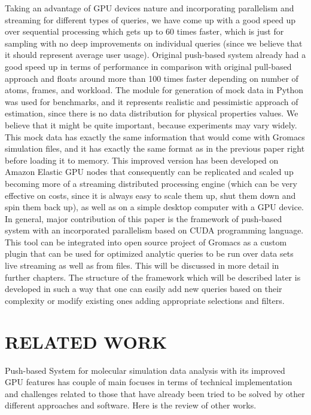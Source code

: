 \documentclass[12pt,letterpaper]{report}
\begin{document}
\noindent\hspace{3em}Taking an advantage of GPU devices nature and incorporating parallelism and streaming for different types of queries, we have come up with a good speed up over sequential processing which gets up to 60 times faster, which is just for sampling with no deep improvements on individual queries (since we believe that it should represent average user usage). Original push-based system already had a good speed up in terms of performance in comparison with original pull-based approach and floats around more than 100 times faster depending on number of atoms, frames, and workload. The module for generation of mock data in Python  was used for benchmarks, and it represents realistic and pessimistic approach of estimation, since there is no data distribution for physical properties values. We believe that it might be quite important, because experiments may vary widely. This mock data has exactly the same information that would come with Gromacs simulation files, and it has exactly the same format as in the previous paper \cite{mainPaper} right before loading it to memory. This improved version has been developed on Amazon Elastic GPU \cite{amazonGPU} nodes that consequently can be replicated and scaled up becoming more of a streaming distributed processing engine (which can be very effective on costs, since it is always easy to scale them up, shut them down and spin them back up), as well as on a simple desktop computer with a GPU device.
In general, major contribution of this paper is the framework of push-based system with an incorporated parallelism based on CUDA programming language. This tool can be integrated into open source project of Gromacs as a custom plugin that can be used for optimized analytic queries to be run over data sets live streaming as well as from files. This will be discussed in more detail in further chapters.
The structure of the framework which will be described later is developed in such a way that one can easily add new queries based on their complexity or modify existing ones adding appropriate selections and filters.



\chapter{RELATED WORK}\label{sc:relatedwork}

\hspace{3em} Push-based System for molecular simulation data analysis with its improved GPU features has couple of main focuses in terms of technical implementation and challenges related to those that have already been tried to be solved by other different approaches and software. Here is the review of other works.
\end{document}
